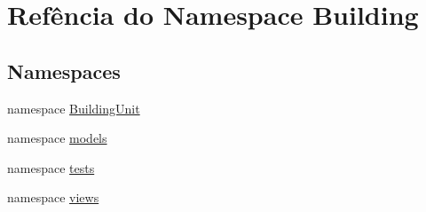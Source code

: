 \hypertarget{namespaceBuilding}{\section{Refência do Namespace Building}
\label{d2/d94/namespaceBuilding}
}
\subsection*{Namespaces}
\begin{DoxyCompactItemize}
\item 
namespace \hyperlink{namespaceBuilding_1_1BuildingUnit}{Building\-Unit}
\item 
namespace \hyperlink{namespaceBuilding_1_1models}{models}
\item 
namespace \hyperlink{namespaceBuilding_1_1tests}{tests}
\item 
namespace \hyperlink{namespaceBuilding_1_1views}{views}
\end{DoxyCompactItemize}
